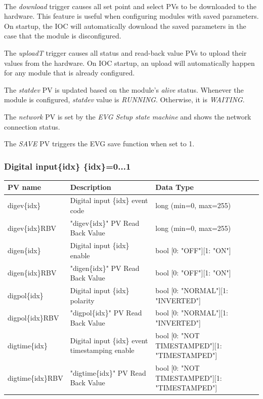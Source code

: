 \documentclass[openany]{article}
\begin{document}
			\paragraph{} The \emph{download} trigger causes all set point and select PVs to be downloaded to the hardware. This feature is useful when configuring modules with saved parameters. On startup, the IOC will automatically download the saved parameters in the case that the module is disconfigured.
			\par The \emph{uploadT} trigger causes all status and read-back value PVs to upload their values from the hardware. On IOC startup, an upload will automatically happen for any module that is already configured.
			\par The \emph{statdev} PV is updated based on the module's \emph{alive} status. Whenever the module is configured, \emph{statdev} value is \emph{RUNNING}. Otherwise, it is \emph{WAITING}.
			\par The \emph{network} PV is set by the \emph{EVG Setup state machine} and shows the network connection status.
			\par The \emph{SAVE} PV triggers the EVG save function when set to 1.

		\subsubsection{Digital input\{idx\} \{idx\}=0...1}\label{pvgroup:evg-digital-input}
			\begin{center}
			\begin{tabular}{| m{2.8cm} m{6cm} m{6cm} |}
			    \hline
			    \bfseries PV name & \bfseries Description & \bfseries Data Type \\ \hline
			    digev\{idx\} & Digital input \{idx\} event code & long (min=0, max=255) \\ \hline
			    digev\{idx\}RBV & "digev\{idx\}" PV Read Back Value & long (min=0, max=255) \\ \hline
			    digen\{idx\} & Digital input \{idx\} enable & bool [0: "OFF"][1: "ON"] \\ \hline
			    digen\{idx\}RBV & "digen\{idx\}" PV Read Back Value & bool [0: "OFF"][1: "ON"] \\ \hline
			    digpol\{idx\} & Digital input \{idx\} polarity & bool [0: "NORMAL"][1: "INVERTED"] \\ \hline
			    digpol\{idx\}RBV & "digpol\{idx\}" PV Read Back Value & bool [0: "NORMAL"][1: "INVERTED"] \\ \hline
			    digtime\{idx\} & Digital input \{idx\} event timestamping enable & bool [0: "NOT TIMESTAMPED"][1: "TIMESTAMPED"] \\ \hline
			    digtime\{idx\}RBV & "digtime\{idx\}" PV Read Back Value & bool [0: "NOT TIMESTAMPED"][1: "TIMESTAMPED"] \\ \hline
			\end{tabular}
			\end{center}
\end{document}
